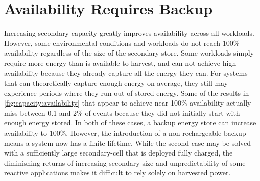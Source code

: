 \section{Availability Requires Backup}
\label{sec:primary:availability}

Increasing secondary capacity greatly improves
availability across all workloads.
However, some environmental
conditions and workloads do not reach 100\% availability regardless of the size
of the secondary store.
Some workloads simply require more energy
than is available to harvest, and can not achieve high availability because they already capture all the energy they can.
For systems that can theoretically capture enough energy on average, they still may experience periods where they run out of stored energy.
Some of the results in \cref{fig:capacity:availability}
that appear to achieve near 100\% availability actually miss between 0.1 and 2\% of events because they did not initially start with enough energy stored.
In both of these cases, a backup energy store can increase availability 
to 100\%.
However, the introduction of a non-rechargeable backup means a system now has a finite lifetime.
While the second case may be solved with a sufficiently large secondary-cell that is deployed fully charged, the
diminishing returns of increasing secondary size and
unpredictability of some reactive applications
makes it difficult to rely solely on harvested power.

